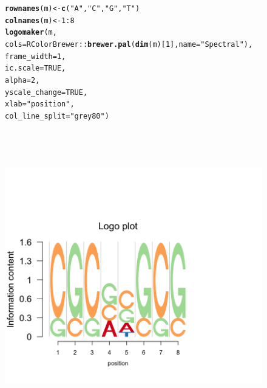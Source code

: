 \documentclass[12pt]{article}\usepackage[]{graphicx}\usepackage[usenames,dvipsnames]{color}
\makeatletter
\newcommand{\hlnum}[1]{\textcolor[rgb]{0.686,0.059,0.569}{#1}}%
\newcommand{\hlstr}[1]{\textcolor[rgb]{0.192,0.494,0.8}{#1}}%
\newcommand{\hlopt}[1]{\textcolor[rgb]{0,0,0}{#1}}%
\newcommand{\hlstd}[1]{\textcolor[rgb]{0.345,0.345,0.345}{#1}}%
\newcommand{\hlkwb}[1]{\textcolor[rgb]{0.69,0.353,0.396}{#1}}%
\newcommand{\hlkwc}[1]{\textcolor[rgb]{0.333,0.667,0.333}{#1}}%
\newcommand{\hlkwd}[1]{\textcolor[rgb]{0.737,0.353,0.396}{\textbf{#1}}}%
\newenvironment{kframe}{%
 \def\at@end@of@kframe{}%
 \ifinner\ifhmode%
  \def\at@end@of@kframe{\end{minipage}}%
  \begin{minipage}{\columnwidth}%
 \fi\fi%
 \def\FrameCommand##1{\hskip\@totalleftmargin \hskip-\fboxsep
 \colorbox{shadecolor}{##1}\hskip-\fboxsep
     \hskip-\linewidth \hskip-\@totalleftmargin \hskip\columnwidth}%
 \MakeFramed {\advance\hsize-\width
   \@totalleftmargin\z@ \linewidth\hsize
   \@setminipage}}%
 {\par\unskip\endMakeFramed%
 \at@end@of@kframe}
\newenvironment{knitrout}{}{} %
\makeatother
\begin{document}
\begin{figure}[h]
\begin{center}
\begin{knitrout}
\color{fgcolor}\begin{kframe}
\begin{alltt}
\hlkwd{rownames}\hlstd{(m)} \hlkwb{<-} \hlkwd{c}\hlstd{(}\hlstr{"A"}\hlstd{,} \hlstr{"C"}\hlstd{,} \hlstr{"G"}\hlstd{,} \hlstr{"T"}\hlstd{)}
\hlkwd{colnames}\hlstd{(m)} \hlkwb{<-} \hlnum{1}\hlopt{:}\hlnum{8}
\hlkwd{logomaker}\hlstd{(m,}
          \hlkwc{cols}\hlstd{= RColorBrewer}\hlopt{::}\hlkwd{brewer.pal}\hlstd{(}\hlkwd{dim}\hlstd{(m)[}\hlnum{1}\hlstd{],}\hlkwc{name} \hlstd{=}\hlstr{"Spectral"}\hlstd{),}
          \hlkwc{frame_width} \hlstd{=} \hlnum{1}\hlstd{,}
          \hlkwc{ic.scale} \hlstd{=} \hlnum{TRUE}\hlstd{,}
          \hlkwc{alpha} \hlstd{=} \hlnum{2}\hlstd{,}
          \hlkwc{yscale_change}\hlstd{=}\hlnum{TRUE}\hlstd{,}
          \hlkwc{xlab}\hlstd{=}\hlstr{"position"}\hlstd{,}
          \hlkwc{col_line_split} \hlstd{=} \hlstr{"grey80"}\hlstd{)}
\end{alltt}
\end{kframe}
\includegraphics[width=6in,height=5in]{figure/logolas_use_2-1} 

\end{knitrout}
\end{center}
\end{figure}
\end{document}
